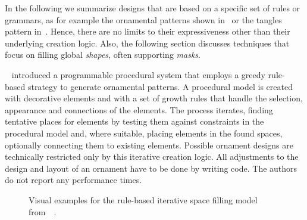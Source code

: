 In the following we summarize designs that are based on a specific set of rules or grammars, as for example the ornamental patterns shown in~ or the tangles pattern in~. Hence, there are no limits to their expressiveness other than their underlying creation logic. Also, the following section discusses techniques that focus on filling global \textit{shapes}, often supporting \textit{masks}.

\citeauthor*{wong_1998_cgf}~\cite{wong_1998_cgf} introduced a programmable procedural system that employs a greedy rule-based strategy to generate ornamental patterns. A procedural model is created with decorative elements and with a set of growth rules that handle the selection, appearance and connections of the elements. The process iterates, finding tentative places for elements by testing them against constraints in the procedural model and, where suitable, placing elements in the found spaces, optionally connecting them to existing elements. Possible ornament designs are technically restricted only by this iterative creation logic. All adjustments to the design and layout of an ornament have to be done by writing code. The authors do not report any performance times.

\begin{figure}[b]
    \centering
    \caption{\label{fig:wong_1998_cgf}Visual examples for the rule-based iterative space filling model from~\citeauthor*{wong_1998_cgf}~\cite{wong_1998_cgf}.}
\end{figure}



